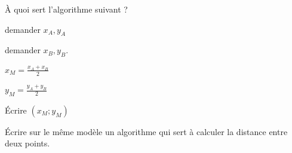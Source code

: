 
\begin{exercice}[\ldots/3]\label{exosmath-0696}

    À quoi sert l'algorithme suivant ?

    \begin{fmpage}{0.9\linewidth}
        demander \( x_A,y_A\)

        demander \( x_B,y_B\).

        \( x_M=\frac{ x_A+x_B }{2}\)

        \( y_M=\frac{ y_A+y_B }{ 2 }\)

        Écrire \( (x_M;y_M)\)
    \end{fmpage}

    Écrire sur le même modèle un algorithme qui sert à calculer la distance entre deux points.

\end{exercice}
